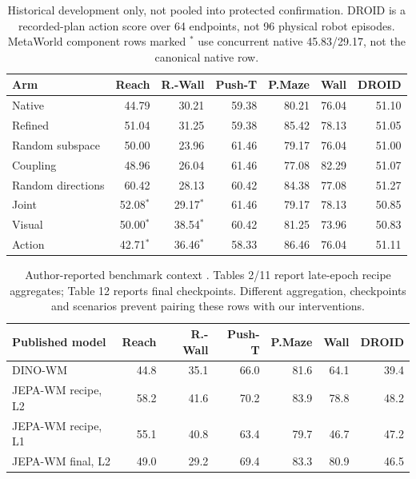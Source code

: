 \documentclass{article}
\begin{document}
\begin{table}[H]
\centering\small
\caption{Historical development only, not pooled into protected confirmation. DROID is a recorded-plan action score over 64 endpoints, not 96 physical robot episodes. MetaWorld component rows marked \(^{*}\) use concurrent native 45.83/29.17, not the canonical native row.}
\setlength{\tabcolsep}{3pt}
\begin{tabular}{@{}lrrrrrr@{}}
\toprule
Arm & Reach & R.-Wall & Push-T & P.Maze & Wall & DROID\\
\midrule
Native & 44.79 & 30.21 & 59.38 & 80.21 & 76.04 & 51.10\\
Refined & 51.04 & 31.25 & 59.38 & 85.42 & 78.13 & 51.05\\
Random subspace & 50.00 & 23.96 & 61.46 & 79.17 & 76.04 & 51.00\\
Coupling & 48.96 & 26.04 & 61.46 & 77.08 & 82.29 & 51.07\\
Random directions & 60.42 & 28.13 & 60.42 & 84.38 & 77.08 & 51.27\\
Joint & 52.08\(^{*}\) & 29.17\(^{*}\) & 61.46 & 79.17 & 78.13 & 50.85\\
Visual & 50.00\(^{*}\) & 38.54\(^{*}\) & 60.42 & 81.25 & 73.96 & 50.83\\
Action & 42.71\(^{*}\) & 36.46\(^{*}\) & 58.33 & 86.46 & 76.04 & 51.11\\
\bottomrule
\end{tabular}
\end{table}

\begin{table}[H]
\centering\small
\caption{Author-reported benchmark context \citep{terver2025jepawm}. Tables 2/11 report late-epoch recipe aggregates; Table 12 reports final checkpoints. Different aggregation, checkpoints and scenarios prevent pairing these rows with our interventions.}
\setlength{\tabcolsep}{4pt}
\begin{tabular}{@{}lrrrrrr@{}}
\toprule
Published model & Reach & R.-Wall & Push-T & P.Maze & Wall & DROID\\
\midrule
DINO-WM & 44.8 & 35.1 & 66.0 & 81.6 & 64.1 & 39.4\\
JEPA-WM recipe, L2 & 58.2 & 41.6 & 70.2 & 83.9 & 78.8 & 48.2\\
JEPA-WM recipe, L1 & 55.1 & 40.8 & 63.4 & 79.7 & 46.7 & 47.2\\
JEPA-WM final, L2 & 49.0 & 29.2 & 69.4 & 83.3 & 80.9 & 46.5\\
\bottomrule
\end{tabular}
\end{table}
\end{document}
